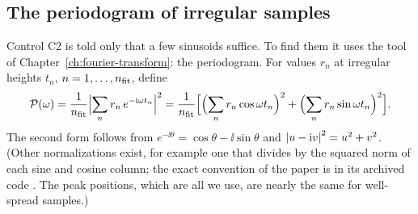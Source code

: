 \subsection{The periodogram of irregular samples}

Control C2 is told only that a few sinusoids suffice. To find them it uses the tool of Chapter~\ref{ch:fourier-transform}: the periodogram. For values $r_n$ at irregular heights $t_n$, $n=1,\dots,n_{\rm fit}$, define
\begin{equation}
\mathcal P(\omega)=\frac{1}{n_{\rm fit}}\Bigl|\sum_{n}r_n\,e^{-\mathrm{i}\omega t_n}\Bigr|^2
=\frac{1}{n_{\rm fit}}\Bigl[\Bigl(\sum_n r_n\cos\omega t_n\Bigr)^2+\Bigl(\sum_n r_n\sin\omega t_n\Bigr)^2\Bigr].
\label{eq:sparse-frequency-periodogram}
\end{equation}
The second form follows from $e^{-\ii\theta}=\cos\theta-\ii\sin\theta$ and $\left\lvert u-\mathrm{i} v\right\rvert^2=u^2+v^2$. (Other normalizations exist, for example one that divides by the squared norm of each sine and cosine column; the exact convention of the paper is in its archived code \cite{zenodo}. The peak positions, which are all we use, are nearly the same for well-spread samples.)

